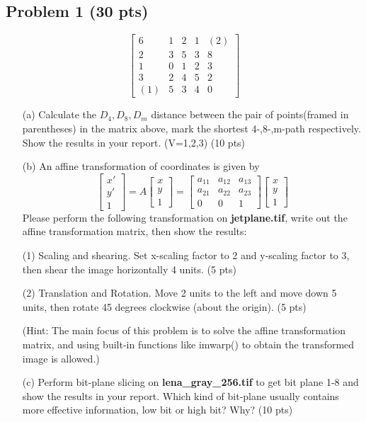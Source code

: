 \documentclass[11pt,letterpaper]{article}
\begin{document}
\subsection*{Problem 1 (30 pts)}
$$
\begin{bmatrix}
6 & 1 & 2 & 1 & (2)\\ 
2 & 3 & 5 & 3 & 8\\ 
1 & 0 & 1 & 2 & 3\\ 
3 & 2 & 4 & 5 & 2\\ 
(1) & 5 & 3 & 4 & 0
\end{bmatrix}
$$
\begin{itemize}
\item[(a)] Calculate the $D_4,D_8,D_m$ distance between the pair of points(framed in parentheses) in the matrix above, mark the shortest 4-,8-,m-path respectively. Show the results in your report. (V=1,2,3) (10 pts)

\item[(b)] An affine transformation of coordinates is given by
$$
\begin{bmatrix}
x'
\\ 
y'
\\ 
1
\end{bmatrix}
=A\begin{bmatrix}
x\\ y\\ 1
\end{bmatrix}
=\begin{bmatrix}
a_{11} & a_{12} & a_{13}\\ 
a_{21} & a_{22} & a_{23}\\ 
0 & 0 & 1
\end{bmatrix}\begin{bmatrix}
x\\y 
\\ 1
\end{bmatrix}
$$
Please perform the following transformation on \textbf{jetplane.tif}, write out the affine transformation matrix, then show the results:

(1) Scaling and shearing. Set x-scaling factor to 2 and y-scaling factor to 3, then shear the image horizontally 4
units. (5 pts)

(2) Translation and Rotation. Move 2 units to the left and move down 5 units, then rotate 45 degrees clockwise
(about the origin). (5 pts)

(\textcolor[rgb]{1,0,0}{Hint:} The main focus of this problem is to solve the affine transformation matrix, and using built-in functions like imwarp() to obtain the transformed image is allowed.)
\item[(c)] Perform bit-plane slicing on \textbf{lena\_gray\_256.tif} to get bit plane 1-8 and show the results in your report. Which kind of bit-plane usually contains more effective information, low bit or high bit? Why? (10 pts)
\end{itemize}
\end{document}
